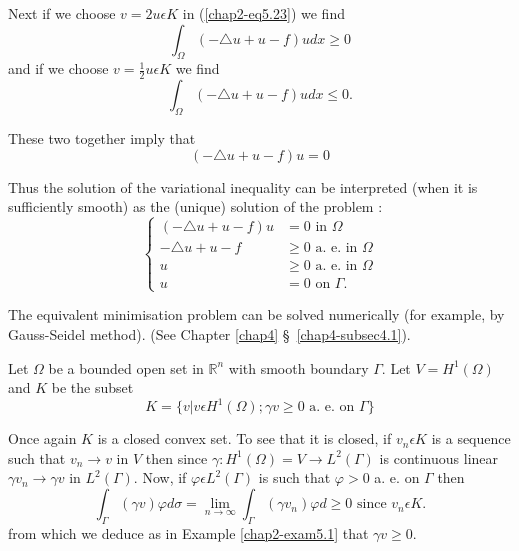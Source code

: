 Next if we choose $v = 2u \epsilon K$ in (\ref{chap2-eq5.23}) we find
$$
\int_{\Omega} (-\triangle u + u - f)u dx \geq 0
$$
and if we choose $v = \frac{1}{2} u \epsilon K$ we find
$$
\int_{\Omega} (-\triangle u + u - f)u dx \leq 0.
$$

These two together imply that
\begin{equation}
(-\triangle u + u-f)u = 0\tag{5.24}\label{chap2-eq5.24}
\end{equation}

Thus the solution of the variational inequality can be interpreted (when it is sufficiently smooth) as the (unique) solution of the problem :
\begin{equation*}
\begin{cases}
(-\triangle u + u-f) u & = 0 \text{ in } \Omega\\
- \triangle u + u - f & \geq 0 \text{ a. e. in } \Omega\\
u & \geq 0 \text{ a. e. in } \Omega\\
u & = 0 \text{ on } \Gamma.\tag{5.25}\label{chap2-eq5.25}
\end{cases}
\end{equation*}

\begin{remark}\label{chap2-rem5.2}
The equivalent minimisation problem can be solved numerically (for example, by Gauss-Seidel method). (See Chapter \ref{chap4} \S\ \ref{chap4-subsec4.1}).
\end{remark}

\setcounter{exercise}{1}
\begin{exercise}\label{chap2-exer5.2}
Let $\Omega$ be a bounded open set in $\mathbb{R}^{n}$ with smooth boundary $\Gamma$. Let $V = H^{1} (\Omega)$ and $K$ be the subset
\begin{equation*}
K = \{v | v \epsilon H^{1} (\Omega) ; \gamma v \geq 0 \text{ a. e. on } \Gamma\}\tag{5.26}\label{chap2-eq5.26}
\end{equation*}\pageoriginale
\end{exercise}

Once again $K$ is a closed convex set. To see that it is closed, if $v_{n} \epsilon K$ is a sequence such that $v_{n} \to v$ in $V$ then since $\gamma : H^{1} (\Omega) = V \to L^{2} (\Gamma)$ is continuous linear $\gamma v_{n} \to \gamma v$ in $L^{2} (\Gamma)$. Now, if $\varphi \epsilon L^{2} (\Gamma)$ is such that $\varphi > 0$ a. e. on $\Gamma$ then
$$
\int_{\Gamma} (\gamma v) \varphi d\sigma = \lim_{n \to \infty} \int_{\Gamma} (\gamma v_{n}) \varphi d \geq 0 \text{ since } v_{n} \epsilon K.
$$
from which we deduce as in Example \ref{chap2-exam5.1} that $\gamma v \geq 0$.

